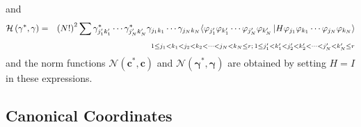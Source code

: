 \documentclass{article}
\begin{document}
and 
\begin{eqnarray}
\mathcal{H}\left( \mathbf{\gamma }^{\ast },\mathbf{\gamma }\right) &=&\left(
N!\right) ^{2}\sum \gamma _{j_{1}^{\prime }k_{1}^{\prime }}^{\ast }\cdots
\gamma _{j_{N}^{\prime }k_{N}^{\prime }}^{\ast }\gamma _{j_{1}k_{1}}\cdots
\gamma _{j_{N}k_{N}}\langle \varphi _{j_{1}^{\prime }}\varphi
_{k_{1}^{\prime }}\cdots \varphi _{j_{N}^{\prime }}\varphi _{k_{N}^{\prime
}}\left| H\varphi _{j_{1}}\varphi _{k_{1}}\cdots \varphi _{j_{N}}\varphi
_{k_{N}}\right\rangle  \notag \\
&&\qquad \qquad \qquad \qquad \quad _{1\leq j_{1}<k_{1}<j_{2}<k_{2}<\cdots
<j_{N}<k_{N}\leq r;\,1\leq j_{1}^{\prime }<k_{1}^{\prime }<j_{2}^{\prime
}<k_{2}^{\prime }<\cdots <j_{N}^{\prime }<k_{N}^{\prime }\leq r}
\end{eqnarray}%
and the norm functions $\mathcal{N}\left( \mathbf{c}^{\ast },\mathbf{c}%
\right) $ and $\mathcal{N}\left( \mathbf{\gamma }^{\ast },\mathbf{\gamma }%
\right) $ are obtained by setting $H=I$ in these expressions.

\subsection{Canonical Coordinates}
\end{document}
